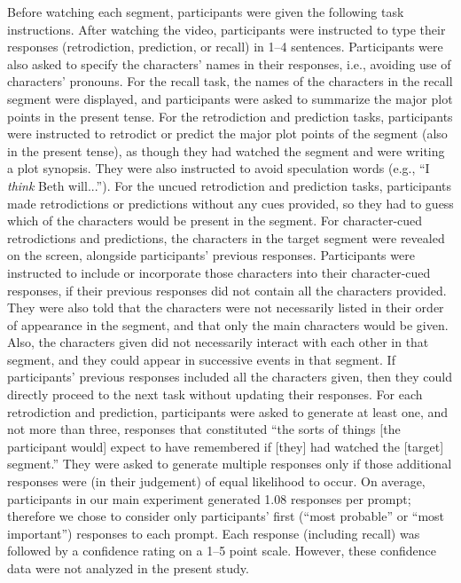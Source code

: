 \documentclass[10pt]{article}
\begin{document}
Before watching each segment, participants were given the following task instructions. After watching the video, participants were instructed to type their responses (retrodiction, prediction, or recall) in 1--4 sentences. Participants were also asked to specify the characters' names in their responses, i.e., avoiding use of characters' pronouns. For the recall task, the names of the characters in the recall segment were displayed, and participants were asked to summarize the major plot points in the present tense. For the retrodiction and prediction tasks, participants were instructed to retrodict or predict the major plot points of the segment (also in the present tense), as though they had watched the segment and were writing a plot synopsis. They were also instructed to avoid speculation words (e.g., ``I \textit{think} Beth will...''). For the uncued retrodiction and prediction tasks, participants made retrodictions or predictions without any cues provided, so they had to guess which of the characters would be present in the segment. For character-cued retrodictions and predictions, the characters in the target segment were revealed on the screen, alongside participants’ previous responses. Participants were instructed to include or incorporate those characters into their character-cued responses, if their previous responses did not contain all the characters provided. They were also told that the characters were not necessarily listed in their order of appearance in the segment, and that only the main characters would be given. Also, the characters given did not necessarily interact with each other in that segment, and they could appear in successive events in that segment. If participants’ previous responses included all the characters given, then they could directly proceed to the next task without updating their responses. 
For each retrodiction and prediction, participants were asked to generate at least one, and not more than three, responses that constituted ``the sorts of things [the participant would] expect to have remembered if [they] had watched the [target] segment.'' They were asked to generate multiple responses only if those additional responses were (in their judgement) of equal likelihood to occur. On average, participants in our main experiment generated 1.08 responses per prompt; therefore we chose to consider only participants' first (``most probable'' or ``most important'') responses to each prompt. Each response (including recall) was followed by a confidence rating on a 1--5 point scale. However, these confidence data were not analyzed in the present study.
\end{document}
